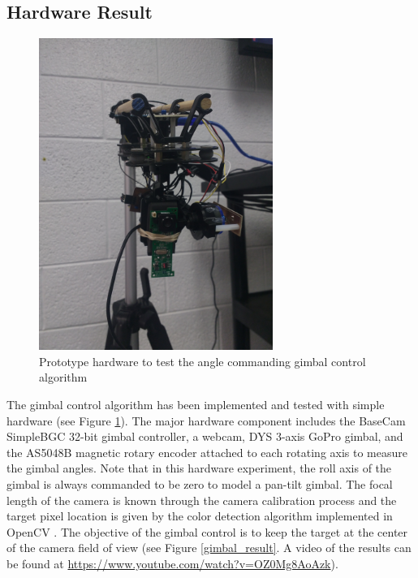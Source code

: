 \subsection{Hardware Result}
\begin{figure}[htbp]
	\centering
	\includegraphics[width = 3in]{images/chapter2/gimbal_webcam.jpg}
	\caption{Prototype hardware to test the angle commanding gimbal control algorithm}
	\label{gimbal_webcam}
\end{figure}

The gimbal control algorithm has been implemented and tested with simple hardware (see Figure \ref{gimbal_webcam}). The major hardware component includes the BaseCam SimpleBGC 32-bit gimbal controller, a webcam, DYS 3-axis GoPro gimbal, and the AS5048B magnetic rotary encoder attached to each rotating axis to measure the gimbal angles. Note that in this hardware experiment, the roll axis of the gimbal is always commanded to be zero to model a pan-tilt gimbal. The focal length of the camera is known through the camera calibration process and the target pixel location is given by the color detection algorithm implemented in OpenCV \cite{itseez2015opencv}. The objective of the gimbal control is to keep the target at the center of the camera field of view (see Figure \ref{gimbal_result}. A video of the results can be found at \href{https://www.youtube.com/watch?v=OZ0Mg8AoAzk}{https://www.youtube.com/watch?v=OZ0Mg8AoAzk}). 

